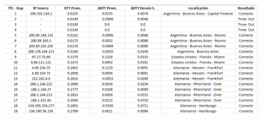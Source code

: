 \begin{figure}[h]
	\begin{center}
    \includegraphics[width=1\textwidth]{img_analisis3/captura.png} 
	\end{center} 
\end{figure}

